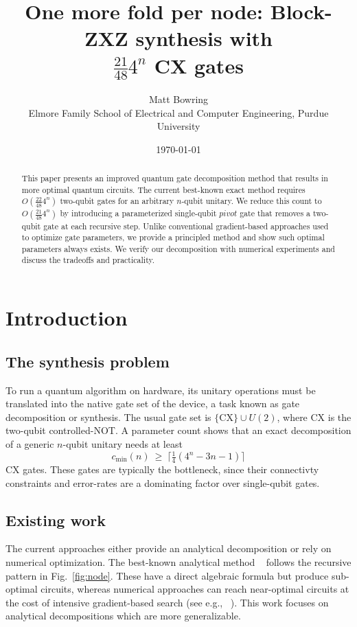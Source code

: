 \documentclass[11pt]{article}
\title{One more fold per node: Block-ZXZ synthesis with\\ $\tfrac{21}{48}4^n$ CX gates}
\author{Matt Bowring\\[2pt]
{\normalsize Elmore Family School of Electrical and Computer Engineering, Purdue University}}
\date{\today}
\newcommand{\CX}{\mathrm{CX}}
\begin{document}
\maketitle

\begin{abstract}
This paper presents an improved quantum gate decomposition method that results in more optimal quantum circuits.
The current best-known exact method requires $O(\frac{22}{48} 4^n)$ two-qubit gates for an arbitrary $n$-qubit unitary. We reduce this count to $O(\frac{21}{48} 4^n)$ by introducing a parameterized single-qubit $\textit{pivot}$ gate that removes a two-qubit gate at each recursive step. Unlike conventional gradient-based approaches used to optimize gate parameters, we provide a principled method and show such optimal parameters always exists. We verify our decomposition with numerical experiments and discuss the tradeoffs and practicality.
\end{abstract}

\section{Introduction}

\subsection{The synthesis problem}

To run a quantum algorithm on hardware, its unitary operations must be translated into the native gate set of the device, a task known as gate decomposition or synthesis. The usual gate set is $\{\CX\}\cup U(2)$, where $\CX$ is the two-qubit controlled-NOT. A parameter count shows that an exact decomposition of a generic $n$-qubit unitary
needs at least~\cite{smb}
\[
c_{\min}(n)\ \ge\ \big\lceil \tfrac14(4^n-3n-1)\big\rceil
\]
CX gates. These gates are typically the bottleneck, since their connectivty constraints and error-rates are a dominating factor over single-qubit gates.

\subsection{Existing work}

The current approaches either provide an analytical decomposition or rely on numerical optimization.
The best-known analytical method ~\cite{smb,zxz} follows the recursive pattern in Fig.~\ref{fig:node}. These have a direct algebraic formula but produce sub-optimal circuits, whereas numerical approaches can reach near-optimal circuits at the cost of intensive gradient-based search (see e.g., ~\cite{brickwall,squander}). This work focuses on analytical decompositions which are more generalizable.
 
\end{document}

